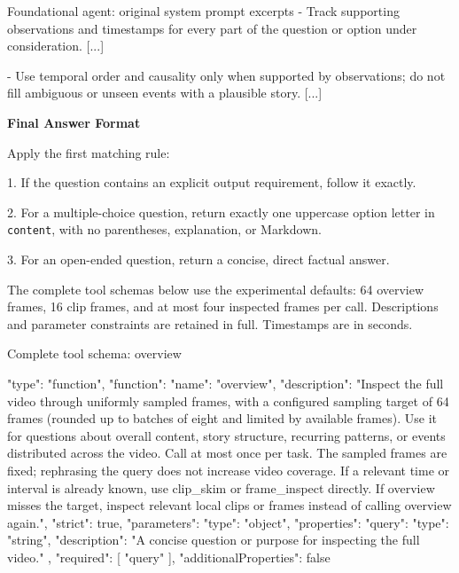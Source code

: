 \begin{AppendixPrompt}{Foundational agent: original system prompt excerpts}
- Track supporting observations and timestamps for every part of the question or option under consideration. [...]

- Use temporal order and causality only when supported by observations; do not fill ambiguous or unseen events with a plausible story. [...]

\textbf{Final Answer Format}\par

Apply the first matching rule:

1. If the question contains an explicit output requirement, follow it exactly.

2. For a multiple-choice question, return exactly one uppercase option letter in \texttt{content}, with no parentheses, explanation, or Markdown.

3. For an open-ended question, return a concise, direct factual answer.
\end{AppendixPrompt}

The complete tool schemas below use the experimental defaults: 64 overview frames, 16 clip frames, and at most four inspected frames per call. Descriptions and parameter constraints are retained in full. Timestamps are in seconds.

\begin{AppendixPrompt}{Complete tool schema: overview}
\begin{ToolSchema}
{
  "type": "function",
  "function": {
    "name": "overview",
    "description": "Inspect the full video through uniformly sampled frames, with a configured sampling target of 64 frames (rounded up to batches of eight and limited by available frames). Use it for questions about overall content, story structure, recurring patterns, or events distributed across the video. Call at most once per task. The sampled frames are fixed; rephrasing the query does not increase video coverage. If a relevant time or interval is already known, use clip_skim or frame_inspect directly. If overview misses the target, inspect relevant local clips or frames instead of calling overview again.",
    "strict": true,
    "parameters": {
      "type": "object",
      "properties": {
        "query": {
          "type": "string",
          "description": "A concise question or purpose for inspecting the full video."
        }
      },
      "required": [
        "query"
      ],
      "additionalProperties": false
    }
  }
}
\end{ToolSchema}
\end{AppendixPrompt}

